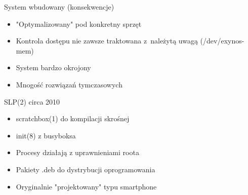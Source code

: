 \documentclass[presentation,aspectratio=43,12pt]{beamer}
\begin{document}
\begin{frame}[label=sec-2-5]{System wbudowany (konsekwencje)}
\begin{itemize}
\item "Optymalizowany" pod konkretny sprzęt

\item <2-> Kontrola dostępu nie zawsze traktowana z~należytą
uwagą (/dev/exynos-mem)

\item <3-> System bardzo okrojony

\item <4-> Mnogość rozwiązań tymczasowych
\end{itemize}

\end{frame}


\begin{frame}[label=sec-2-6]{SLP(2) circa 2010}
\begin{itemize}
\item scratchbox(1) do kompilacji skrośnej
\item <2-> init(8) z busyboksa
\item <3-> Procesy działają z uprawnieniami roota
\item <4-> Pakiety .deb do dystrybucji oprogramowania
\item <5-> Oryginalnie "projektowany" typu smartphone
\end{itemize}

\end{frame}
\end{document}
